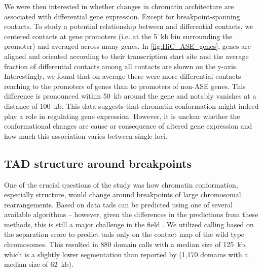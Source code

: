 
We were then interested in whether changes in chromatin architecture are
associated with differential gene expression. Except for breakpoint-spanning
contacts. To study a potential relationship between \ase and differential
contacts, we centered \hic contacts at gene promoters (i.e. at the 5~kb bin
surrounding the promoter) and averaged across many genes. In
\cref{fig:HiC_ASE_genes}, genes are aligned and oriented according to their
transcription start site and the average fraction of differential contacts among
all contacts are shown on the y-axis. Interestingly, we found that on average
there were more differential \hic contacts reaching to the promoters of
\ase genes than to promoters of non-ASE genes. This difference is pronounced
within 50~kb around the gene and notably vanishes at a distance of 100~kb.
This data suggests that chromatin conformation might indeed play a role in
regulating gene expression. However, it is unclear whether the conformational
changes are cause or consequence of altered gene expression and how much this
association varies between single loci.





\subsection{TAD structure around breakpoints}
\label{sec:balancer_tads_at_bp}

One of the crucial questions of the study was how chromatin conformation,
especially \tad structure, would change around breakpoints of large chromosomal
rearrangements. Based on \hic data \acp{tad} can be predicted using one of
several available algorithms – however, given the differences in the predictions
from these methods, this is still a major challenge in the field
\citep[notably figure 3]{Forcato2017}. We utilized \tad calling based on the
\tad separation score \citep{Ramirez2018} to predict \acp{tad} only on the
contact map of the wild type chromosomes. This resulted in 880 domain calls with
a median size of 125~kb, which is a slightly lower segmentation than reported by
\cite{Sexton2012} (1,170 domains with a median size of 62~kb).

